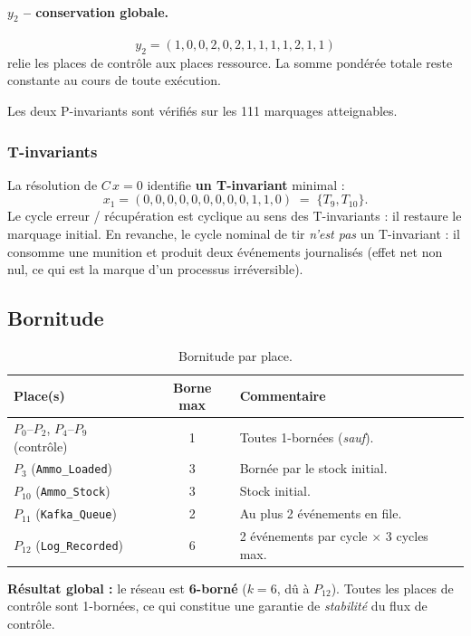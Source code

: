 \documentclass[11pt,a4paper]{article}
\newcommand{\code}[1]{\texttt{#1}}
\begin{document}
\paragraph{$y_2$ -- conservation globale.}
\[
y_2 = (1,0,0,2,0,2,1,1,1,1,2,1,1)
\]
relie les places de contrôle aux places ressource. La somme pondérée totale
reste constante au cours de toute exécution.

Les deux P-invariants sont vérifiés sur les 111 marquages atteignables.

\subsubsection{T-invariants}

La résolution de $C\,x = 0$ identifie \textbf{un T-invariant} minimal :
\[
x_1 = (0,0,0,0,0,0,0,0,0,1,1,0) \;=\; \{T_9, T_{10}\}.
\]
Le cycle erreur / récupération est cyclique au sens des T-invariants : il
restaure le marquage initial. En revanche, le cycle nominal de tir
\emph{n'est pas} un T-invariant : il consomme une munition et produit deux
événements journalisés (effet net non nul, ce qui est la marque d'un
processus irréversible).

\subsection{Bornitude}

\begin{table}[H]
\centering\small
\begin{tabular}{l c l}
\toprule
\rowcolor{tableheader}\textbf{Place(s)} & \textbf{Borne max} & \textbf{Commentaire} \\
\midrule
$P_0$--$P_2$, $P_4$--$P_9$ (contrôle) & 1 & Toutes 1-bornées (\emph{sauf}). \\
$P_3$ (\code{Ammo\_Loaded})           & 3 & Bornée par le stock initial. \\
$P_{10}$ (\code{Ammo\_Stock})         & 3 & Stock initial. \\
$P_{11}$ (\code{Kafka\_Queue})        & 2 & Au plus 2 événements en file. \\
$P_{12}$ (\code{Log\_Recorded})       & 6 & 2 événements par cycle $\times$ 3 cycles max. \\
\bottomrule
\end{tabular}
\caption{Bornitude par place.}
\end{table}

\noindent
\textbf{Résultat global :} le réseau est \textbf{6-borné} ($k=6$, dû à
$P_{12}$). Toutes les places de contrôle sont 1-bornées, ce qui constitue
une garantie de \emph{stabilité} du flux de contrôle.
\end{document}
